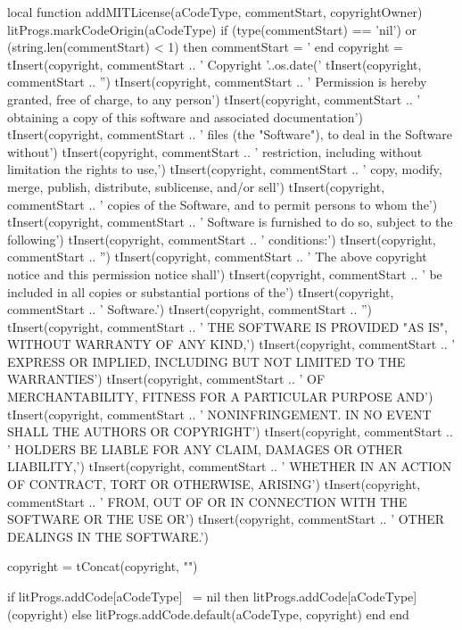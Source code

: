 local function addMITLicense(aCodeType, commentStart, copyrightOwner)
  litProgs.markCodeOrigin(aCodeType)
  if (type(commentStart) == 'nil') or (string.len(commentStart) < 1) then
    commentStart = '%
  end
  copyright = { }
  tInsert(copyright, commentStart ..
    ' Copyright '..os.date('%
  tInsert(copyright,  commentStart ..
    '')
  tInsert(copyright, commentStart ..
    ' Permission is hereby granted, free of charge, to any person')
  tInsert(copyright, commentStart ..
    ' obtaining a copy of this software and associated documentation')
  tInsert(copyright, commentStart ..
    ' files (the "Software"), to deal in the Software without')
  tInsert(copyright, commentStart ..
    ' restriction, including without limitation the rights to use,')
  tInsert(copyright, commentStart ..
    ' copy, modify, merge, publish, distribute, sublicense, and/or sell')
  tInsert(copyright, commentStart ..
    ' copies of the Software, and to permit persons to whom the')
  tInsert(copyright, commentStart ..
    ' Software is furnished to do so, subject to the following')
  tInsert(copyright, commentStart ..
    ' conditions:')
  tInsert(copyright, commentStart ..
    '')
  tInsert(copyright, commentStart ..
    '    The above copyright notice and this permission notice shall')
  tInsert(copyright, commentStart ..
    '    be included in all copies or substantial portions of the')
  tInsert(copyright, commentStart ..
    '    Software.')
  tInsert(copyright, commentStart ..
    '')
  tInsert(copyright, commentStart ..
    ' THE SOFTWARE IS PROVIDED "AS IS", WITHOUT WARRANTY OF ANY KIND,')
  tInsert(copyright, commentStart ..
    ' EXPRESS OR IMPLIED, INCLUDING BUT NOT LIMITED TO THE WARRANTIES')
  tInsert(copyright, commentStart ..
    ' OF MERCHANTABILITY, FITNESS FOR A PARTICULAR PURPOSE AND')
  tInsert(copyright, commentStart ..
    ' NONINFRINGEMENT. IN NO EVENT SHALL THE AUTHORS OR COPYRIGHT')
  tInsert(copyright, commentStart ..
    ' HOLDERS BE LIABLE FOR ANY CLAIM, DAMAGES OR OTHER LIABILITY,')
  tInsert(copyright, commentStart ..
    ' WHETHER IN AN ACTION OF CONTRACT, TORT OR OTHERWISE, ARISING')
  tInsert(copyright, commentStart ..
    ' FROM, OUT OF OR IN CONNECTION WITH THE SOFTWARE OR THE USE OR')
  tInsert(copyright, commentStart ..
    ' OTHER DEALINGS IN THE SOFTWARE.')

  copyright = tConcat(copyright, "\n")

  if litProgs.addCode[aCodeType] ~= nil then
    litProgs.addCode[aCodeType](copyright)
  else
    litProgs.addCode.default(aCodeType, copyright)
  end
end

